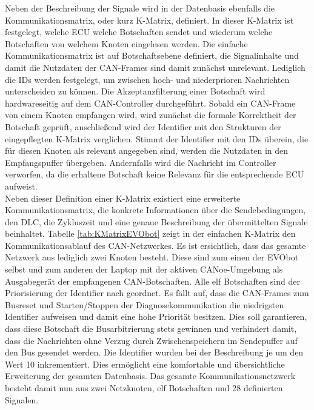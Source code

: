 Neben der Beschreibung der Signale wird in der Datenbasis ebenfalls die Kommunikationsmatrix, oder kurz K-Matrix, definiert. In dieser K-Matrix ist festgelegt, welche \acs{ECU} welche Botschaften sendet und wiederum welche Botschaften von welchem Knoten eingelesen werden. Die einfache Kommunikationsmatrix ist auf Botschaftsebene definiert, die Signalinhalte und damit die Nutzdaten der CAN-Frames sind damit zunächst unrelevant. Lediglich die \acs{ID}s werden festgelegt, um zwischen hoch- und niederprioren Nachrichten unterscheiden zu können. Die Akzeptanzfilterung einer Botschaft wird hardwareseitig auf dem CAN-Controller durchgeführt. Sobald ein CAN-Frame von einem Knoten empfangen wird, wird zunächst die formale Korrektheit der Botschaft geprüft, anschließend wird der Identifier mit den Strukturen der eingepflegten K-Matrix verglichen. Stimmt der Identifier mit den \acs{ID}s überein, die für diesen Knoten als relevant angegeben sind, werden die Nutzdaten in den Empfangspuffer übergeben. Andernfalls wird die Nachricht im Controller verworfen, da die erhaltene Botschaft keine Relevanz für die entsprechende \acs{ECU} aufweist.\\
Neben dieser Definition einer K-Matrix existiert eine erweiterte Kommunikationsmatrix, die konkrete Informationen über die Sendebedingungen, den \acs{DLC}, die Zykluszeit und eine genaue Beschreibung der übermittelten Signale beinhaltet. Tabelle \ref{tab:KMatrixEVObot} zeigt in der einfachen K-Matrix den Kommunikationsablauf des CAN-Netzwerkes. Es ist ersichtlich, dass das gesamte Netzwerk aus lediglich zwei Knoten besteht. Diese sind zum einen der EVObot selbst und zum anderen der Laptop mit der aktiven CANoe-Umgebung als Ausgabegerät der empfangenen CAN-Botschaften. Alle elf Botschaften sind der Priorisierung der Identifier nach geordnet. Es fällt auf, dass die CAN-Frames zum Busreset und Starten/Stoppen der Diagnosekommunikation die niedrigsten Identifier aufweisen und damit eine hohe Priorität besitzen. Dies soll garantieren, dass diese Botschaft die Busarbitrierung stets gewinnen und verhindert damit, dass die Nachrichten ohne Verzug durch Zwischenspeichern im Sendepuffer auf den Bus gesendet werden. Die Identifier wurden bei der Beschreibung je um den Wert 10 inkrementiert. Dies ermöglicht eine komfortable und übersichtliche Erweiterung der gesamten Datenbasis. Das gesamte Kommunikationsnetzwerk besteht damit nun aus zwei Netzknoten, elf Botschaften und 28 definierten Signalen. 

